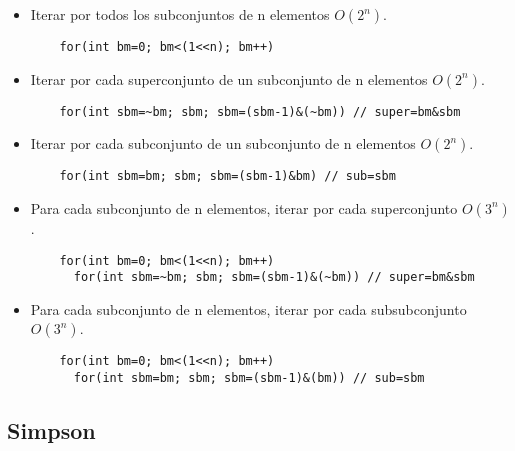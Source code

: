 \documentclass[a4paper,11pt,landscape,twocolumn]{article}
\begin{document}
\begin{itemize}
  \item Iterar por todos los subconjuntos de n elementos $O(2^n)$.
  \begin{lstlisting}
    for(int bm=0; bm<(1<<n); bm++)
  \end{lstlisting}

  \item Iterar por cada superconjunto de un subconjunto de n elementos $O(2^n)$.
  \begin{lstlisting}
    for(int sbm=~bm; sbm; sbm=(sbm-1)&(~bm)) // super=bm&sbm
  \end{lstlisting}

  \item Iterar por cada subconjunto de un subconjunto de n elementos $O(2^n)$.
  \begin{lstlisting}
    for(int sbm=bm; sbm; sbm=(sbm-1)&bm) // sub=sbm
  \end{lstlisting}

  \item Para cada subconjunto de n elementos, iterar por cada superconjunto $O(3^n)$.
  \begin{lstlisting}
    for(int bm=0; bm<(1<<n); bm++)
      for(int sbm=~bm; sbm; sbm=(sbm-1)&(~bm)) // super=bm&sbm
  \end{lstlisting}

  \item Para cada subconjunto de n elementos, iterar por cada subsubconjunto $O(3^n)$.
  \begin{lstlisting}
    for(int bm=0; bm<(1<<n); bm++)
      for(int sbm=bm; sbm; sbm=(sbm-1)&(bm)) // sub=sbm
  \end{lstlisting}
\end{itemize}

\subsection{Simpson}


\end{document}
